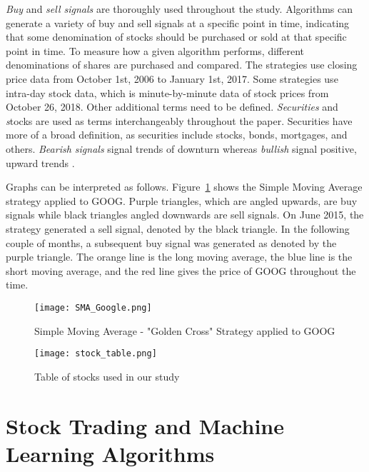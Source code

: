 \documentclass[../thesis.tex]{subfiles}
\begin{document}
\textit {Buy} and \textit {sell signals} are thoroughly used throughout the study. Algorithms can generate a variety of buy and sell signals at a specific point in time, indicating that some denomination of stocks should be purchased or sold at that specific point in time. To measure how a given algorithm performs, different denominations of shares are purchased and compared. The strategies use closing price data from October 1st, 2006 to January 1st, 2017. Some strategies use intra-day stock data, which is minute-by-minute data of stock prices from October 26, 2018. Other additional terms need to be defined. \textit {Securities} and {\textit stocks } are used as terms interchangeably throughout the paper. Securities have more of a broad definition, as securities include stocks, bonds, mortgages, and others. \textit {Bearish signals} signal trends of downturn whereas \textit {bullish} signal positive, upward trends \cite{Aldridge2010}. 

Graphs can be interpreted as follows. Figure~\ref{SMAfigure} shows the Simple Moving Average strategy applied to GOOG. Purple triangles, which are angled upwards, are buy signals while black triangles angled downwards are sell signals. On June 2015, the strategy generated a sell signal, denoted by the black triangle. In the following couple of months, a subsequent buy signal was generated as denoted by the purple triangle. The orange line is the long moving average, the blue line is the short moving average, and the red line gives the price of GOOG throughout the time. 

\begin{figure}[h]
\centering
\texttt{[image: SMA\_Google.png]}
\caption{Simple Moving Average - "Golden Cross" Strategy applied to GOOG \label{overflow}}
\label{SMAfigure}
\end{figure}

\begin{figure}[h]
\centering
\texttt{[image: stock\_table.png]}
\caption{Table of stocks used in our study \label{overflow}}
\label{stocktable}
\end{figure}

\section{Stock Trading and Machine Learning Algorithms}
\end{document}
